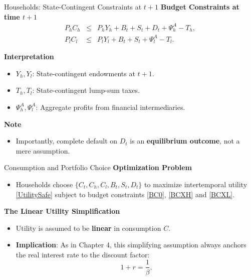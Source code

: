 \documentclass[11pt,aspectratio=169]{beamer}
\begin{document}
\begin{frame}{Households: State-Contingent Constraints at $t+1$}
\small
\textbf{Budget Constraints at time $t+1$}
\begin{eqnarray}
P_{h}C_{h} &\leq &P_{h}Y_{h}+B_{t}+S_{t}+D_{t}+\Psi _{h}^{A}-T_{h}, \label{BCXH} \\
P_{l}C_{l} &\leq &P_{l}Y_{l}+B_{t}+S_{t}+\Psi _{l}^{A}-T_{l}. \label{BCXL}
\end{eqnarray}

\textbf{Interpretation}
\begin{itemize}
    \item $Y_{h}, Y_{l}$: State-contingent endowments at $t+1$.
    \item $T_{h}, T_{l}$: State-contingent lump-sum taxes.
    \item $\Psi_{h}^{A}, \Psi_{l}^{A}$: Aggregate profits from financial intermediaries.
\end{itemize}

\vspace{0.3cm}
\textbf{Note}
\begin{itemize}
    \item Importantly, complete default on $D_t$ is an \textbf{equilibrium outcome}, not a mere assumption.
\end{itemize}
\end{frame}

\begin{frame}{Consumption and Portfolio Choice}
\small
\textbf{Optimization Problem}
\begin{itemize}
    \item Households choose $\{C_t, C_h, C_l, B_t, S_t, D_t\}$ to maximize intertemporal utility \eqref{UtilitySafe} subject to budget constraints \eqref{BC0}, \eqref{BCXH} and \eqref{BCXL}.
\end{itemize}

\vspace{0.4cm}
\textbf{The Linear Utility Simplification}
\begin{itemize}
    \item Utility is assumed to be \textbf{linear} in consumption $C$.
    \item \textbf{Implication}: As in Chapter 4, this simplifying assumption always anchors the real interest rate to the discount factor:
    \begin{equation*}
        1+r = \frac{1}{\beta}.
    \end{equation*}
\end{itemize}
\end{frame}
\end{document}

